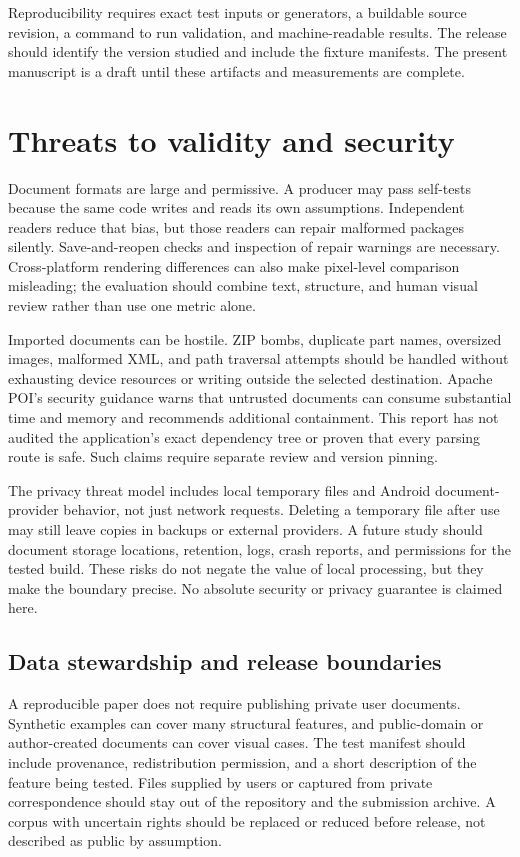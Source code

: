 \documentclass[10pt,letterpaper]{article}
\begin{document}
Reproducibility requires exact test inputs or generators, a buildable source revision, a command to run validation, and machine-readable results. The release should identify the version studied and include the fixture manifests. The present manuscript is a draft until these artifacts and measurements are complete.

\section{Threats to validity and security}

Document formats are large and permissive. A producer may pass self-tests because the same code writes and reads its own assumptions. Independent readers reduce that bias, but those readers can repair malformed packages silently. Save-and-reopen checks and inspection of repair warnings are necessary. Cross-platform rendering differences can also make pixel-level comparison misleading; the evaluation should combine text, structure, and human visual review rather than use one metric alone.

Imported documents can be hostile. ZIP bombs, duplicate part names, oversized images, malformed XML, and path traversal attempts should be handled without exhausting device resources or writing outside the selected destination. Apache POI's security guidance \cite{r2} warns that untrusted documents can consume substantial time and memory and recommends additional containment. This report has not audited the application's exact dependency tree or proven that every parsing route is safe. Such claims require separate review and version pinning.

The privacy threat model includes local temporary files and Android document-provider behavior, not just network requests. Deleting a temporary file after use may still leave copies in backups or external providers. A future study should document storage locations, retention, logs, crash reports, and permissions for the tested build. These risks do not negate the value of local processing, but they make the boundary precise. No absolute security or privacy guarantee is claimed here.

\subsection{Data stewardship and release boundaries}

A reproducible paper does not require publishing private user documents. Synthetic examples can cover many structural features, and public-domain or author-created documents can cover visual cases. The test manifest should include provenance, redistribution permission, and a short description of the feature being tested. Files supplied by users or captured from private correspondence should stay out of the repository and the submission archive. A corpus with uncertain rights should be replaced or reduced before release, not described as public by assumption.
\end{document}
